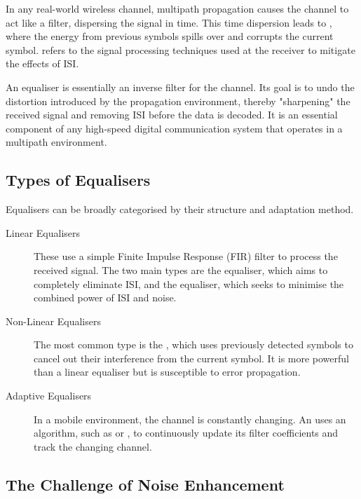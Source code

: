 In any real-world wireless channel, multipath propagation causes the channel to act like a filter, dispersing the signal in time. This time dispersion leads to , where the energy from previous symbols spills over and corrupts the current symbol.  refers to the signal processing techniques used at the receiver to mitigate the effects of ISI.

\begin{keyconcept}
    An equaliser is essentially an inverse filter for the channel. Its goal is to undo the distortion introduced by the propagation environment, thereby "sharpening" the received signal and removing ISI before the data is decoded. It is an essential component of any high-speed digital communication system that operates in a multipath environment.
\end{keyconcept}


\subsection{Types of Equalisers}

Equalisers can be broadly categorised by their structure and adaptation method.
\begin{description}
    \item[Linear Equalisers] These use a simple Finite Impulse Response (FIR) filter to process the received signal. The two main types are the  equaliser, which aims to completely eliminate ISI, and the  equaliser, which seeks to minimise the combined power of ISI and noise.
    \item[Non-Linear Equalisers] The most common type is the , which uses previously detected symbols to cancel out their interference from the current symbol. It is more powerful than a linear equaliser but is susceptible to error propagation.
    \item[Adaptive Equalisers] In a mobile environment, the channel is constantly changing. An  uses an algorithm, such as  or , to continuously update its filter coefficients and track the changing channel.
\end{description}


\subsection{The Challenge of Noise Enhancement}

